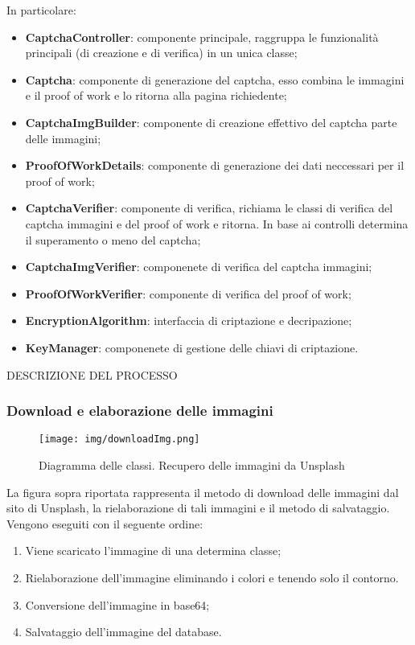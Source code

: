 In particolare:
\begin{itemize}
    \item \textbf{CaptchaController}: componente principale, raggruppa le funzionalità principali (di creazione e di verifica) in un unica classe;
    \item \textbf{Captcha}: componente di generazione del captcha, esso combina le immagini e il proof of work e lo ritorna alla pagina richiedente;
    \item \textbf{CaptchaImgBuilder}: componente di creazione effettivo del captcha parte delle immagini;
    \item \textbf{ProofOfWorkDetails}: componente di generazione dei dati neccessari per il proof of work;
    \item \textbf{CaptchaVerifier}: componente di verifica, richiama le classi di verifica del captcha immagini e del proof of work e ritorna. In base ai controlli determina il superamento o meno del captcha;
    \item \textbf{CaptchaImgVerifier}: componenete di verifica del captcha immagini;
    \item \textbf{ProofOfWorkVerifier}: componente di verifica del proof of work;
    \item \textbf{EncryptionAlgorithm}: interfaccia di criptazione e decripazione;
    \item \textbf{KeyManager}: componenete di gestione delle chiavi di criptazione.
\end{itemize}

DESCRIZIONE DEL PROCESSO

\subsubsection{Download e elaborazione delle immagini}

\begin{figure}[H]
    \centering
    \texttt{[image: img/downloadImg.png]}\\
    \caption{Diagramma delle classi. Recupero delle immagini da Unsplash}
\end{figure}

La figura sopra riportata rappresenta il metodo di download delle immagini dal sito di Unsplash, la rielaborazione di tali immagini e
il metodo di salvataggio. Vengono eseguiti con il seguente ordine:
\begin{enumerate}
    \item Viene scaricato l'immagine di una determina classe;
    \item Rielaborazione dell'immagine eliminando i colori e tenendo solo il contorno.
    \item Conversione dell'immagine in base64;
    \item Salvataggio dell'immagine del database.
\end{enumerate}

